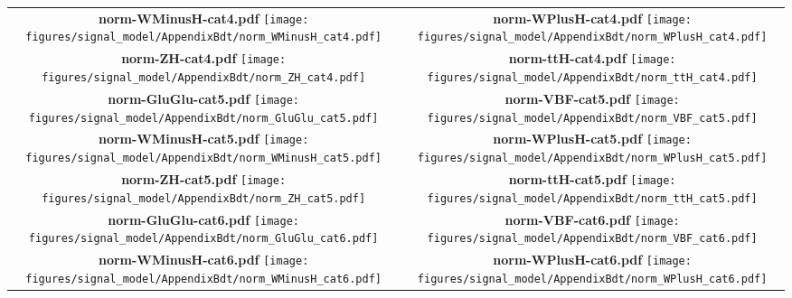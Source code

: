 \begin{longtable}{|c|c|}
{}
 \\
\hline
\parbox{0.47\textwidth}{
\centering
{\bfseries norm-WMinusH-cat4.pdf}
\texttt{[image: figures/signal\_model/AppendixBdt/norm\_WMinusH\_cat4.pdf]}
}
 & \parbox{0.47\textwidth}{
\centering
{\bfseries norm-WPlusH-cat4.pdf}
\texttt{[image: figures/signal\_model/AppendixBdt/norm\_WPlusH\_cat4.pdf]}
}
 \\
\hline
\parbox{0.47\textwidth}{
\centering
{\bfseries norm-ZH-cat4.pdf}
\texttt{[image: figures/signal\_model/AppendixBdt/norm\_ZH\_cat4.pdf]}
}
 & \parbox{0.47\textwidth}{
\centering
{\bfseries norm-ttH-cat4.pdf}
\texttt{[image: figures/signal\_model/AppendixBdt/norm\_ttH\_cat4.pdf]}
}
 \\
\hline
\parbox{0.47\textwidth}{
\centering
{\bfseries norm-GluGlu-cat5.pdf}
\texttt{[image: figures/signal\_model/AppendixBdt/norm\_GluGlu\_cat5.pdf]}
}
 & \parbox{0.47\textwidth}{
\centering
{\bfseries norm-VBF-cat5.pdf}
\texttt{[image: figures/signal\_model/AppendixBdt/norm\_VBF\_cat5.pdf]}
}
 \\
\hline
\parbox{0.47\textwidth}{
\centering
{\bfseries norm-WMinusH-cat5.pdf}
\texttt{[image: figures/signal\_model/AppendixBdt/norm\_WMinusH\_cat5.pdf]}
}
 & \parbox{0.47\textwidth}{
\centering
{\bfseries norm-WPlusH-cat5.pdf}
\texttt{[image: figures/signal\_model/AppendixBdt/norm\_WPlusH\_cat5.pdf]}
}
 \\
\hline
\parbox{0.47\textwidth}{
\centering
{\bfseries norm-ZH-cat5.pdf}
\texttt{[image: figures/signal\_model/AppendixBdt/norm\_ZH\_cat5.pdf]}
}
 & \parbox{0.47\textwidth}{
\centering
{\bfseries norm-ttH-cat5.pdf}
\texttt{[image: figures/signal\_model/AppendixBdt/norm\_ttH\_cat5.pdf]}
}
 \\
\hline
\parbox{0.47\textwidth}{
\centering
{\bfseries norm-GluGlu-cat6.pdf}
\texttt{[image: figures/signal\_model/AppendixBdt/norm\_GluGlu\_cat6.pdf]}
}
 & \parbox{0.47\textwidth}{
\centering
{\bfseries norm-VBF-cat6.pdf}
\texttt{[image: figures/signal\_model/AppendixBdt/norm\_VBF\_cat6.pdf]}
}
 \\
\hline
\parbox{0.47\textwidth}{
\centering
{\bfseries norm-WMinusH-cat6.pdf}
\texttt{[image: figures/signal\_model/AppendixBdt/norm\_WMinusH\_cat6.pdf]}
}
 & \parbox{0.47\textwidth}{
\centering
{\bfseries norm-WPlusH-cat6.pdf}
\texttt{[image: figures/signal\_model/AppendixBdt/norm\_WPlusH\_cat6.pdf]}
}
\end{longtable}
